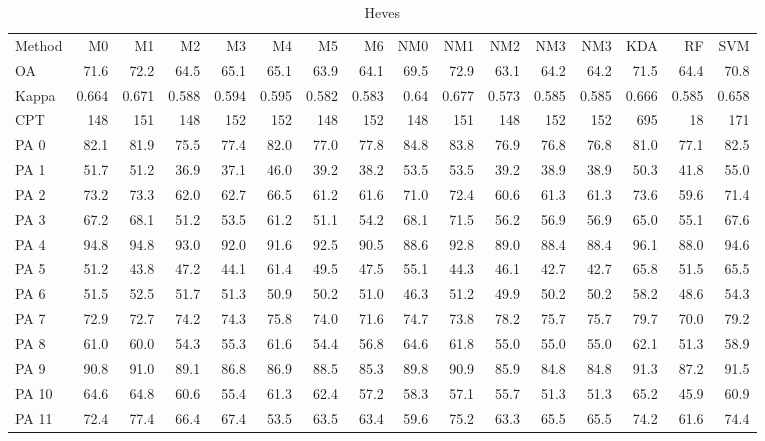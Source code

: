 \documentclass[a4paper,10pt,DIV=16]{scrartcl}
\begin{document}
\begin{table}[h]
  \footnotesize
  \centering
  \caption{Heves}
  \begin{tabular}{lrrrrrrrrrrrrrrr}
    Method & M0 & M1 & M2 & M3 & M4 & M5 & M6 & NM0 & NM1 & NM2 & NM3 & NM3 & KDA & RF & SVM \\
    OA & 71.6 & 72.2 & 64.5 & 65.1 & 65.1 & 63.9 & 64.1 & 69.5 & 72.9 & 63.1 & 64.2 & 64.2 & 71.5 & 64.4 & 70.8 \\
    Kappa & 0.664 & 0.671 & 0.588 & 0.594 & 0.595 & 0.582 & 0.583 & 0.64 & 0.677 & 0.573 & 0.585 & 0.585 & 0.666 & 0.585 & 0.658 \\
    CPT & 148 & 151 & 148 & 152 & 152 & 148 & 152 & 148 & 151 & 148 & 152 & 152 & 695 & 18 & 171 \\
    PA 0 & 82.1 & 81.9 & 75.5 & 77.4 & 82.0 & 77.0 & 77.8 & 84.8 & 83.8 & 76.9 & 76.8 & 76.8 & 81.0 & 77.1 & 82.5 \\
    PA 1 & 51.7 & 51.2 & 36.9 & 37.1 & 46.0 & 39.2 & 38.2 & 53.5 & 53.5 & 39.2 & 38.9 & 38.9 & 50.3 & 41.8 & 55.0 \\
    PA 2 & 73.2 & 73.3 & 62.0 & 62.7 & 66.5 & 61.2 & 61.6 & 71.0 & 72.4 & 60.6 & 61.3 & 61.3 & 73.6 & 59.6 & 71.4 \\
    PA 3 & 67.2 & 68.1 & 51.2 & 53.5 & 61.2 & 51.1 & 54.2 & 68.1 & 71.5 & 56.2 & 56.9 & 56.9 & 65.0 & 55.1 & 67.6 \\
    PA 4 & 94.8 & 94.8 & 93.0 & 92.0 & 91.6 & 92.5 & 90.5 & 88.6 & 92.8 & 89.0 & 88.4 & 88.4 & 96.1 & 88.0 & 94.6 \\
    PA 5 & 51.2 & 43.8 & 47.2 & 44.1 & 61.4 & 49.5 & 47.5 & 55.1 & 44.3 & 46.1 & 42.7 & 42.7 & 65.8 & 51.5 & 65.5 \\
    PA 6 & 51.5 & 52.5 & 51.7 & 51.3 & 50.9 & 50.2 & 51.0 & 46.3 & 51.2 & 49.9 & 50.2 & 50.2 & 58.2 & 48.6 & 54.3 \\
    PA 7 & 72.9 & 72.7 & 74.2 & 74.3 & 75.8 & 74.0 & 71.6 & 74.7 & 73.8 & 78.2 & 75.7 & 75.7 & 79.7 & 70.0 & 79.2 \\
    PA 8 & 61.0 & 60.0 & 54.3 & 55.3 & 61.6 & 54.4 & 56.8 & 64.6 & 61.8 & 55.0 & 55.0 & 55.0 & 62.1 & 51.3 & 58.9 \\
    PA 9 & 90.8 & 91.0 & 89.1 & 86.8 & 86.9 & 88.5 & 85.3 & 89.8 & 90.9 & 85.9 & 84.8 & 84.8 & 91.3 & 87.2 & 91.5 \\
    PA 10 & 64.6 & 64.8 & 60.6 & 55.4 & 61.3 & 62.4 & 57.2 & 58.3 & 57.1 & 55.7 & 51.3 & 51.3 & 65.2 & 45.9 & 60.9 \\
    PA 11 & 72.4 & 77.4 & 66.4 & 67.4 & 53.5 & 63.5 & 63.4 & 59.6 & 75.2 & 63.3 & 65.5 & 65.5 & 74.2 & 61.6 & 74.4 \\

\end{tabular}
\end{table}
\end{document}
